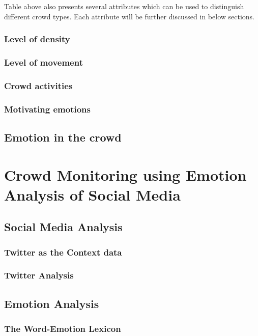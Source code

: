 Table above also presents several attributes which can be used to distinguish different crowd types. Each attribute will be further discussed in below sections.

\subsubsection{Level of density}

\subsubsection{Level of movement}

\subsubsection{Crowd activities}

\subsubsection{Motivating emotions}

\subsection{Emotion in the crowd}

\section{Crowd Monitoring using Emotion Analysis of Social Media}

\subsection{Social Media Analysis}

\subsubsection{Twitter as the Context data}

\subsubsection{Twitter Analysis}

\subsection{Emotion Analysis}

\subsubsection{The Word-Emotion Lexicon}

